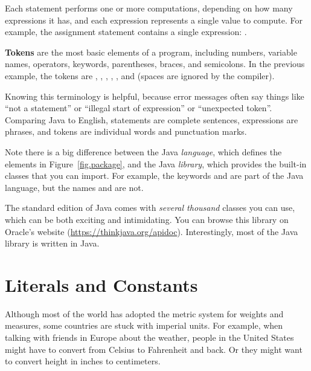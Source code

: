 Each statement performs one or more computations, depending on how many expressions it has, and each expression represents a single value to compute.
For example, the assignment statement  contains a single expression: .

{\bf Tokens} are the most basic elements of a program, including numbers, variable names, operators, keywords, parentheses, braces, and semicolons.
In the previous example, the tokens are , \java{=}, , \java{/}, , and \java{;} (spaces are ignored by the compiler).


Knowing this terminology is helpful, because error messages often say things like ``not a statement'' or ``illegal start of expression'' or ``unexpected token''.
Comparing Java to English, statements are complete sentences, expressions are phrases, and tokens are individual words and punctuation marks.

Note there is a big difference between the Java {\em language}, which defines the elements in Figure~\ref{fig.package}, and the Java {\em library}, which provides the built-in classes that you can import.
For example, the keywords  and  are part of the Java language, but the names  and  are not.

The standard edition of Java comes with {\em several thousand} classes you can use, which can be both exciting and intimidating.
You can browse this library on Oracle's website (\url{https://thinkjava.org/apidoc}).
Interestingly, most of the Java library is written in Java.


\section{Literals and Constants}

Although most of the world has adopted the metric system for weights and measures, some countries are stuck with imperial units.
For example, when talking with friends in Europe about the weather, people in the United States might have to convert from Celsius to Fahrenheit and back.
Or they might want to convert height in inches to centimeters.

